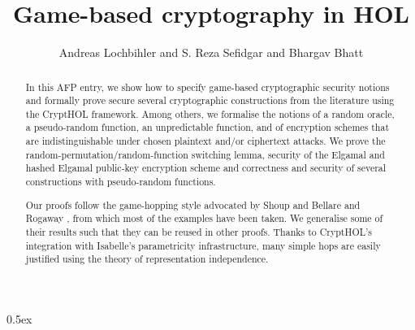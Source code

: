 \documentclass[11pt,a4paper]{article}
\begin{document}
\title{Game-based cryptography in HOL}
\author{Andreas Lochbihler and S. Reza Sefidgar and Bhargav Bhatt}
\maketitle

\begin{abstract}
  In this AFP entry, we show how to specify game-based cryptograph\-ic security notions and formally prove secure
  several cryptographic constructions from the literature using the CryptHOL framework.
  Among others, we formalise the notions of a random oracle, a pseudo-random function, an
  unpredictable function, and of encryption schemes that are indistinguishable under chosen plaintext
  and/or ciphertext attacks.
  We prove the random-permutation/random-function switching lemma, security of the Elgamal
  and hashed Elgamal public-key encryption scheme and correctness and security of several
  constructions with pseu\-do-random functions.

  Our proofs follow the game-hopping style advocated by Shoup \cite{Shoup2004IACR} and Bellare and
  Rogaway \cite{BellareRogaway2006EUROCRYPT}, from which most of the examples have been taken.
  We generalise some of their results such that they can be reused in other proofs.
  Thanks to CryptHOL's integration with Isabelle's parametricity infrastructure, many simple hops
  are easily justified using the theory of representation independence.
\end{abstract}


\tableofcontents

\clearpage

\parindent 0pt\parskip 0.5ex





\end{document}
